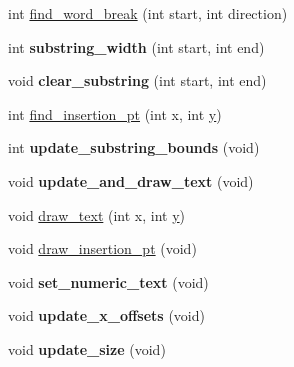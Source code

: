 \begin{DoxyCompactItemize}
\item 
int \hyperlink{class_g_l_u_i___edit_text_a9ae76bc752e7f6a8ea183c8d52844f6c}{find\+\_\+word\+\_\+break} (int start, int direction)
\item 
\hypertarget{class_g_l_u_i___edit_text_a66b06ccdabaaee5ee00e77602f1aaa73}{int {\bfseries substring\+\_\+width} (int start, int end)}\label{class_g_l_u_i___edit_text_a66b06ccdabaaee5ee00e77602f1aaa73}

\item 
\hypertarget{class_g_l_u_i___edit_text_a7d8d760a5559a3317a8a080877fdab4b}{void {\bfseries clear\+\_\+substring} (int start, int end)}\label{class_g_l_u_i___edit_text_a7d8d760a5559a3317a8a080877fdab4b}

\item 
int \hyperlink{class_g_l_u_i___edit_text_adb7c9266e9e33ec38a2d81fbe83421b2}{find\+\_\+insertion\+\_\+pt} (int x, int \hyperlink{_ice_utils_8h_aa7ffaed69623192258fb8679569ff9ba}{y})
\item 
\hypertarget{class_g_l_u_i___edit_text_a9787add80a6790d07796499508ebf62b}{int {\bfseries update\+\_\+substring\+\_\+bounds} (void)}\label{class_g_l_u_i___edit_text_a9787add80a6790d07796499508ebf62b}

\item 
\hypertarget{class_g_l_u_i___edit_text_acbd51f12d68de3e4444ac21e709aef50}{void {\bfseries update\+\_\+and\+\_\+draw\+\_\+text} (void)}\label{class_g_l_u_i___edit_text_acbd51f12d68de3e4444ac21e709aef50}

\item 
void \hyperlink{class_g_l_u_i___edit_text_a37917739d5f240356d893b3d07d9afe6}{draw\+\_\+text} (int x, int \hyperlink{_ice_utils_8h_aa7ffaed69623192258fb8679569ff9ba}{y})
\item 
void \hyperlink{class_g_l_u_i___edit_text_acc67640b9e92d5c6c84e4f685762aaf4}{draw\+\_\+insertion\+\_\+pt} (void)
\item 
\hypertarget{class_g_l_u_i___edit_text_a7b1c3f892a2c340e8c7328a260d92d08}{void {\bfseries set\+\_\+numeric\+\_\+text} (void)}\label{class_g_l_u_i___edit_text_a7b1c3f892a2c340e8c7328a260d92d08}

\item 
\hypertarget{class_g_l_u_i___edit_text_a7875ec7ab7213fbe52370436b4a8af8c}{void {\bfseries update\+\_\+x\+\_\+offsets} (void)}\label{class_g_l_u_i___edit_text_a7875ec7ab7213fbe52370436b4a8af8c}

\item 
\hypertarget{class_g_l_u_i___edit_text_acb10946b2666d84c57a321cda5ab2abb}{void {\bfseries update\+\_\+size} (void)}\label{class_g_l_u_i___edit_text_acb10946b2666d84c57a321cda5ab2abb}


\end{DoxyCompactItemize}
